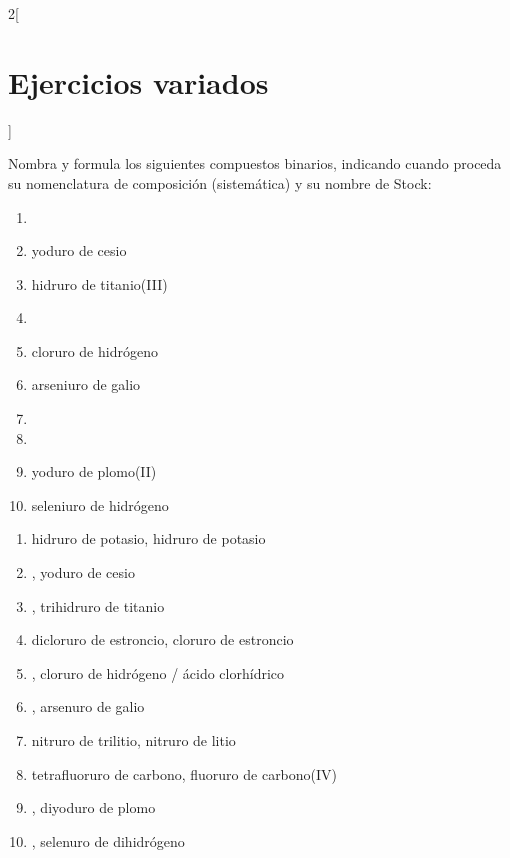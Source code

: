 \documentclass[10pt]{article}
\begin{document}
\begin{multicols*}{2}[
  \section{Ejercicios variados}
  ]

\begin{exercise}[
    tags    = {inorgánica,compuestos binarios,sales binarias,sales,hidruros},
    topics  = {química inorgánica,formulación,nomenclatura},
    source  = {SAN Formulación, p26, e28},
  ]
  Nombra y formula los siguientes compuestos binarios, indicando cuando proceda su nomenclatura de composición (sistemática) y su nombre de Stock:

  \begin{enumerate}
    \item {}
    \item yoduro de cesio
    \item hidruro de titanio(III)
    \item {}
    \item cloruro de hidrógeno
    \item arseniuro de galio
    \item {}
    \item {}
    \item yoduro de plomo(II)
    \item seleniuro de hidrógeno
  \end{enumerate}
\end{exercise}

\begin{solution}
  \begin{enumerate}
    \item hidruro de potasio, hidruro de potasio
    \item {}, yoduro de cesio
    \item {}, trihidruro de titanio
    \item dicloruro de estroncio, cloruro de estroncio
    \item {}, cloruro de hidrógeno / ácido clorhídrico
    \item {}, arsenuro de galio
    \item nitruro de trilitio, nitruro de litio
    \item tetrafluoruro de carbono, fluoruro de carbono(IV)
    \item {}, diyoduro de plomo
    \item {}, selenuro de dihidrógeno
  \end{enumerate}
\end{solution}




\end{multicols*}
\end{document}
